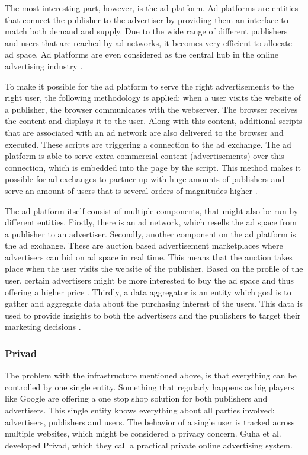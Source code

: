 The most interesting part, however, is the ad platform. Ad platforms are entities that connect the publisher to the advertiser by providing them an interface to match both demand and supply. Due to the wide range of different publishers and users that are reached by ad networks, it becomes very efficient to allocate ad space. Ad platforms are even considered as the central hub in the online advertising industry \cite{estrada2017online}.

To make it possible for the ad platform to serve the right advertisements to the right user, the following methodology is applied: when a user visits the website of a publisher, the browser communicates with the webserver. The browser receives the content and displays it to the user. Along with this content, additional scripts that are associated with an ad network are also delivered to the browser and executed. These scripts are triggering a connection to the ad exchange. The ad platform is able to serve extra commercial content (advertisements) over this connection, which is embedded into the page by the script. This method makes it possible for ad exchanges to partner up with huge amounts of publishers and serve an amount of users that is several orders of magnitudes higher \cite{estrada2017online}.

The ad platform itself consist of multiple components, that might also be run by different entities. Firstly, there is an ad network, which resells the ad space from a publisher to an advertiser. Secondly, another component on the ad platform is the ad exchange. These are auction based advertisement marketplaces where advertisers can bid on ad space in real time. This means that the auction takes place when the user visits the website of the publisher. Based on the profile of the user, certain advertisers might be more interested to buy the ad space and thus offering a higher price \cite{estrada2017online}. Thirdly, a data aggregator is an entity which goal is to gather and aggregate data about the purchasing interest of the users. This data is used to provide insights to both the advertisers and the publishers to target their marketing decisions \cite{estrada2017online}.

\subsubsection{Privad}
\label{sec:privad}
The problem with the infrastructure mentioned above, is that everything can be controlled by one single entity. Something that regularly happens as big players like Google are offering a one stop shop solution for both publishers and advertisers. This single entity knows everything about all parties involved: advertisers, publishers and users. The behavior of a single user is tracked across multiple websites, which might be considered a privacy concern. Guha et al. \cite{guha2011privad} developed Privad, which they call a practical private online advertising system.

